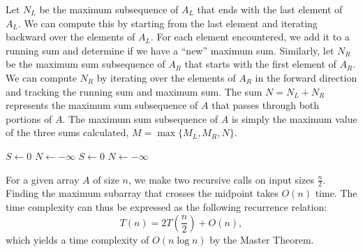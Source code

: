 \documentclass[11pt]{article}
\begin{document}
Let $N_L$ be the maximum subsequence of $A_L$ that ends with the last element of $A_L$. We can compute this by starting from the last element and iterating backward over the elements of $A_L$. For each element encountered, we add it to a running sum and determine if we have a ``new'' maximum sum. Similarly, let $N_R$ be the maximum sum subsequence of $A_R$ that starts with the first element of $A_R$. We can compute $N_R$ by iterating over the elements of $A_R$ in the forward direction and tracking the running sum and maximum sum. The sum $N = N_L + N_R$ represents the maximum sum subsequence of $A$ that passes through both portions of $A$. The maximum sum subsequence of $A$ is simply the maximum value of the three sums calculated, $M = \max \{M_L, M_R, N\}$.

\IncMargin{2em}
\begin{algorithm}[H]
    \footnotesize
    \DontPrintSemicolon
    \BlankLine
     {
        $S \gets 0$ 
        $N \gets -\infty$ 
        \BlankLine
        \BlankLine
    }
    \BlankLine
     {
        $S \gets 0$ 
        $N \gets -\infty$ 
        \BlankLine
        \BlankLine
    }
    \BlankLine
\end{algorithm}\DecMargin{2em} 
For a given array $A$ of size $n$, we make two recursive calls on input sizes $\frac{n}{2}$. Finding the maximum subarray that crosses the midpoint takes $O(n)$ time. The time complexity can thus be expressed as the following recurrence relation:
\begin{equation}
    T(n) = 2T \left(\frac{n}{2}\right) + O(n), 
\end{equation}
which yields a time complexity of $O(n \log n)$ by the Master Theorem.
\end{document}
